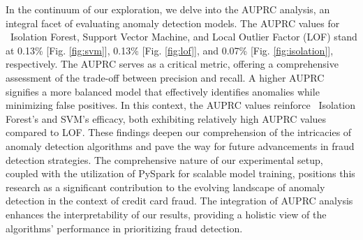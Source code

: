 \documentclass[journal]{IEEEtran}
\begin{document}
In the continuum of our exploration, we delve into the AUPRC analysis, an integral facet of evaluating anomaly detection models. The AUPRC values for ~Isolation Forest, Support Vector Machine, and Local Outlier Factor (LOF) stand at 0.13\% [Fig. \ref{fig:svm}], 0.13\% [Fig. \ref{fig:lof}], and 0.07\% [Fig. \ref{fig:isolation}], respectively. The AUPRC serves as a critical metric, offering a comprehensive assessment of the trade-off between precision and recall. A higher AUPRC signifies a more balanced model that effectively identifies anomalies while minimizing false positives. In this context, the AUPRC values reinforce ~Isolation Forest's and SVM's efficacy, both exhibiting relatively high AUPRC values compared to LOF. These findings deepen our comprehension of the intricacies of anomaly detection algorithms and pave the way for future advancements in fraud detection strategies. The comprehensive nature of our experimental setup, coupled with the utilization of PySpark for scalable model training, positions this research as a significant contribution to the evolving landscape of anomaly detection in the context of credit card fraud. The integration of AUPRC analysis enhances the interpretability of our results, providing a holistic view of the algorithms' performance in prioritizing fraud detection.






%
\end{document}
